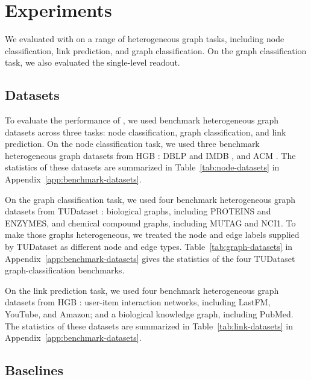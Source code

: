 \section{Experiments}
\label{sec:experiments}

We evaluated \method{} with \ampss{} on a range of heterogeneous graph tasks, including node classification, link prediction, and graph classification. On the graph classification task, we also evaluated the single-level \sheafconvpool{} readout.

\subsection{Datasets}
To evaluate the performance of \method{}, we used benchmark heterogeneous graph datasets across three tasks: node classification, graph classification, and link prediction.
On the node classification task, we used three benchmark heterogeneous graph datasets from HGB \cite{lv2021hgb}: DBLP \cite{lv2021hgb} and IMDB \cite{lv2021hgb}, and ACM \cite{wang2019han}. The statistics of these datasets are summarized in Table~\ref{tab:node-datasets} in Appendix~\ref{app:benchmark-datasets}. 

On the graph classification task, we used four benchmark heterogeneous graph datasets from TUDataset \cite{morris2020tudataset}: biological graphs, including PROTEINS and ENZYMES, and chemical compound graphs, including MUTAG and NCI1. To make those graphs heterogeneous, we treated the node and edge labels supplied by TUDataset as different node and edge types. Table~\ref{tab:graph-datasets} in Appendix~\ref{app:benchmark-datasets} gives the statistics of the four TUDataset graph-classification benchmarks.

On the link prediction task, we used four benchmark heterogeneous graph datasets from HGB \cite{lv2021hgb}: user-item interaction networks, including LastFM, YouTube, and Amazon; and a biological knowledge graph, including PubMed. The statistics of these datasets are summarized in Table~\ref{tab:link-datasets} in Appendix~\ref{app:benchmark-datasets}.


\subsection{Baselines}

